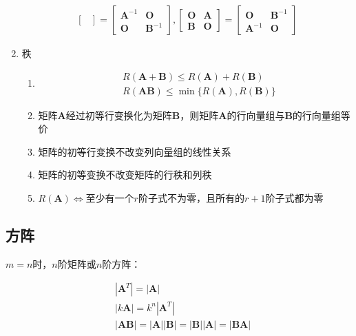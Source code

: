 \documentclass[12pt]{book}
\begin{document}
\begin{enumerate}[1.]
\begin{gather*}
\begin{bmatrix}
              \end{bmatrix}
              = \begin{bmatrix}
                  \bm{A}^{-1} & \bm{O}      \\
                  \bm{O}      & \bm{B}^{-1}
              \end{bmatrix},
              \begin{bmatrix}
                  \bm{O} & \bm{A} \\
                  \bm{B} & \bm{O}
              \end{bmatrix}
              =\begin{bmatrix}
                  \bm{O}      & \bm{B}^{-1} \\
                  \bm{A}^{-1} & \bm{O}
              \end{bmatrix}
          \end{gather*}
    \item 秩
          \begin{enumerate}[(1)]
              \item \begin{align*}
                         & R(\bm{A}+\bm{B})\leqslant R(\bm{A})+R(\bm{B} ) \\
                         & R(\bm{AB})\leqslant \min\{R(\bm{A}),R(\bm{B})\}
                    \end{align*}
              \item 矩阵$\bm{A}$经过初等行变换化为矩阵$\bm{B}$，则矩阵$\bm{A}$的行向量组与$\bm{B}$的行向量组等价
              \item 矩阵的初等行变换不改变列向量组的线性关系
              \item 矩阵的初等变换不改变矩阵的行秩和列秩
              \item $R(\bm{A})\Leftrightarrow$至少有一个$r$阶子式不为零，且所有的$r+1$阶子式都为零
          \end{enumerate}
\end{enumerate}



\subsection{方阵}

$m=n$时，$n$阶矩阵或$n$阶方阵：

\begin{align*}
& |\mathbf{A}^T| = |\mathbf{A}| \\
& |k \mathbf{A}| = k^n |\mathbf{A}^T| \\
& |\mathbf{A}\mathbf{B}| = |\mathbf{A}| |\mathbf{B}| = |\mathbf{B}| |\mathbf{A}| = |\mathbf{B}\mathbf{A}|
\end{align*}
\end{document}
